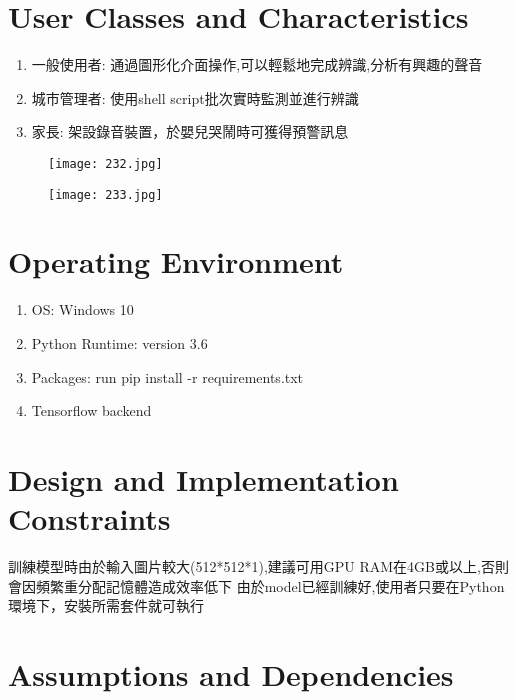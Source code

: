 \documentclass{scrreprt}
\begin{document}
\begin{CJK*}{UTF8}{bsmi}
\section{User Classes and Characteristics}
\begin{enumerate}
\item 一般使用者: 通過圖形化介面操作,可以輕鬆地完成辨識,分析有興趣的聲音
\item 城市管理者: 使用shell script批次實時監測並進行辨識
\item 家長: 架設錄音裝置，於嬰兒哭鬧時可獲得預警訊息
\end{enumerate}
\begin{figure} [h]
\centering
\texttt{[image: 232.jpg]}
\end{figure}
\begin{figure} [h]
\centering
\texttt{[image: 233.jpg]}
\end{figure}
\section{Operating Environment}
\begin{enumerate}
\item OS: Windows 10
\item Python Runtime: version 3.6
\item Packages: run pip install -r requirements.txt
\item Tensorflow backend
\end{enumerate}

\section{Design and Implementation Constraints}
訓練模型時由於輸入圖片較大(512*512*1),建議可用GPU RAM在4GB或以上,否則會因頻繁重分配記憶體造成效率低下 由於model已經訓練好,使用者只要在Python環境下，安裝所需套件就可執行

\section{Assumptions and Dependencies}


\end{CJK*}
\end{document}
